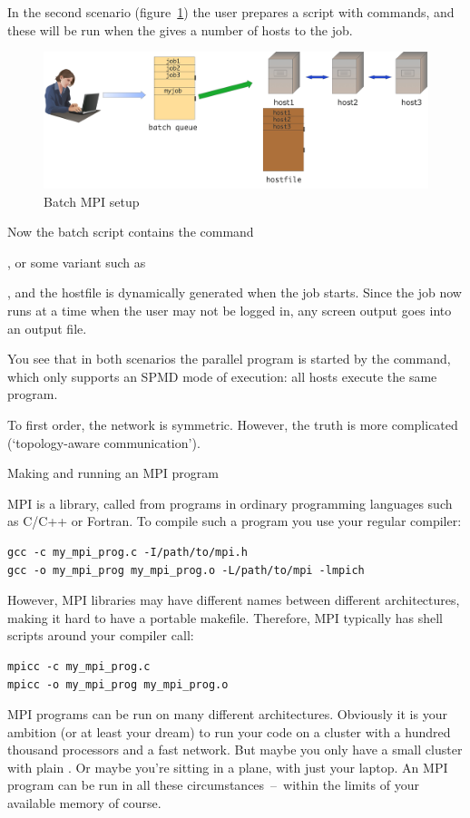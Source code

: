 In the second scenario (figure~\ref{fig:mpi-batch}) the user prepares
a  script with commands, and these will be
run when the  gives a number of hosts
to the job.
\begin{figure}[ht]
  \includegraphics[scale=.1]{graphics/mpi-batch}
  \caption{Batch MPI setup}
  \label{fig:mpi-batch}
\end{figure}
Now the batch script contains the  command%
\begin{istc}
, or some variant such as %
\end{istc}
, and the hostfile is dynamically generated when the job starts.
Since the job now runs at a time when the user may not be logged in, 
any screen output goes into an output file.

You see that in both scenarios the parallel program is started
by the  command, which only supports
an \ac{SPMD} mode of execution: all hosts execute the same program.

To first order, the network is symmetric. However, the truth is more 
complicated (`topology-aware communication').

 {Making and running an MPI program}

MPI is a library, called from programs in ordinary programming languages
such as C/C++ or Fortran. To compile such a program you use your regular
compiler:
\begin{verbatim}
gcc -c my_mpi_prog.c -I/path/to/mpi.h
gcc -o my_mpi_prog my_mpi_prog.o -L/path/to/mpi -lmpich
\end{verbatim}
However, MPI libraries may have different names between different
architectures, making it hard to have a portable makefile. Therefore,
MPI typically has shell scripts around your compiler call:
\begin{verbatim}
mpicc -c my_mpi_prog.c
mpicc -o my_mpi_prog my_mpi_prog.o
\end{verbatim}

MPI programs can be run on many different architectures. Obviously it
is your ambition (or at least your dream) to run your code on a
cluster with a hundred thousand processors and a fast network. But
maybe you only have a small cluster with
plain . Or maybe you're sitting in a plane, with
just your laptop. An MPI program can be run in all these
circumstances~--~within the limits of your available memory of course.

